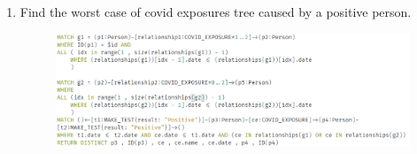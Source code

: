 \begin{enumerate}[leftmargin=*,label=\textbf{\thesection.\arabic*}]
\begin{figure}[!h]
    \end{figure}
    \item Find the worst case of covid exposures tree caused by a positive person.
    \begin{figure}[!h]  
        \includegraphics[width=\textwidth]{images/worst_tree_of_exposures.png}
    \end{figure}
\end{enumerate}